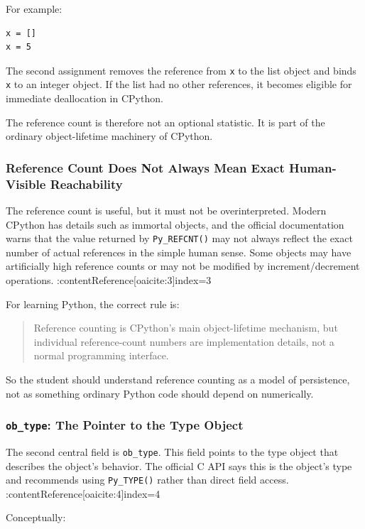 For example:

\begin{verbatim}
x = []
x = 5
\end{verbatim}

The second assignment removes the reference from \texttt{x} to the list object and binds \texttt{x} to an integer object. If the list had no other references, it becomes eligible for immediate deallocation in CPython.

The reference count is therefore not an optional statistic. It is part of the ordinary object-lifetime machinery of CPython.

\subsubsection*{Reference Count Does Not Always Mean Exact Human-Visible Reachability}

The reference count is useful, but it must not be overinterpreted. Modern CPython has details such as immortal objects, and the official documentation warns that the value returned by \texttt{Py\_REFCNT()} may not always reflect the exact number of actual references in the simple human sense. Some objects may have artificially high reference counts or may not be modified by increment/decrement operations. :contentReference[oaicite:3]{index=3}

For learning Python, the correct rule is:

\begin{quote}
Reference counting is CPython's main object-lifetime mechanism, but individual reference-count numbers are implementation details, not a normal programming interface.
\end{quote}

So the student should understand reference counting as a model of persistence, not as something ordinary Python code should depend on numerically.

\subsubsection*{\texttt{ob\_type}: The Pointer to the Type Object}

The second central field is \texttt{ob\_type}. This field points to the type object that describes the object's behavior. The official C API says this is the object's type and recommends using \texttt{Py\_TYPE()} rather than direct field access. :contentReference[oaicite:4]{index=4}

Conceptually:


